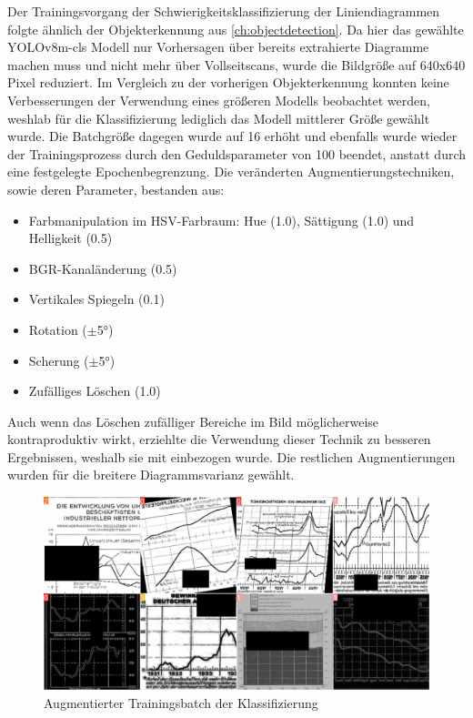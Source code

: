 Der Trainingsvorgang der Schwierigkeitsklassifizierung der Liniendiagrammen folgte ähnlich der Objekterkennung aus \ref{ch:objectdetection}. Da hier das gewählte YOLOv8m-cls Modell nur Vorhersagen über bereits extrahierte Diagramme machen muss und nicht mehr über Vollseitscans, wurde die Bildgröße auf 640x640 Pixel reduziert. Im Vergleich zu der vorherigen Objekterkennung konnten keine Verbesserungen der Verwendung eines größeren Modells beobachtet werden, weshlab für die Klassifizierung lediglich das Modell mittlerer Größe gewählt wurde. Die Batchgröße dagegen wurde auf 16 erhöht und ebenfalls wurde wieder der Trainingsprozess durch den Geduldsparameter von 100 beendet, anstatt durch eine festgelegte Epochenbegrenzung. Die veränderten Augmentierungstechniken, sowie deren Parameter, bestanden aus:

\begin{itemize}[itemsep=0pt, topsep=0pt]
    \item Farbmanipulation im HSV-Farbraum: Hue (1.0), Sättigung (1.0) und Helligkeit (0.5)
    \item BGR-Kanaländerung (0.5)
    \item Vertikales Spiegeln (0.1)
    \item Rotation ($\pm$5°)
    \item Scherung ($\pm$5°)
    \item Zufälliges Löschen (1.0)
\end{itemize}

Auch wenn das Löschen zufälliger Bereiche im Bild möglicherweise kontraproduktiv wirkt, erziehlte die Verwendung dieser Technik zu besseren Ergebnissen, weshalb sie mit einbezogen wurde. Die restlichen Augmentierungen wurden für die breitere Diagrammsvarianz gewählt.

\begin{figure}[H]
    \centering
    \captionsetup{width=.75\linewidth}
    \includegraphics[width=.75\textwidth]{Implementation/img/classify_train_batch.jpg}
    \caption{ Augmentierter Trainingsbatch der Klassifizierung}
    \label{fig:classify_train_batch}
\end{figure}

